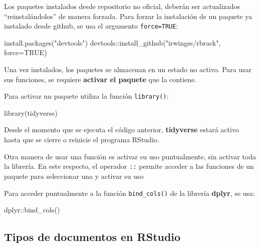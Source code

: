 \documentclass[
]{article}
\newenvironment{Shaded}{\begin{snugshade}}{\end{snugshade}}
\newcommand{\AttributeTok}[1]{\textcolor[rgb]{0.77,0.63,0.00}{#1}}
\newcommand{\ConstantTok}[1]{\textcolor[rgb]{0.00,0.00,0.00}{#1}}
\newcommand{\FunctionTok}[1]{\textcolor[rgb]{0.00,0.00,0.00}{#1}}
\newcommand{\NormalTok}[1]{#1}
\newcommand{\SpecialCharTok}[1]{\textcolor[rgb]{0.00,0.00,0.00}{#1}}
\newcommand{\StringTok}[1]{\textcolor[rgb]{0.31,0.60,0.02}{#1}}
\theoremstyle{definition}
\theoremstyle{definition}
\theoremstyle{definition}
\theoremstyle{definition}
\theoremstyle{remark}
\begin{document}
Los paquetes instalados desde repositorio no oficial, deberán ser actualizados ``reinstalándolos'' de manera forzada. Para forzar la instalación de un paquete ya instalado desde github, se usa el argumento \texttt{force=TRUE}:

\begin{Shaded}
\begin{Highlighting}[]
\FunctionTok{install.packages}\NormalTok{(}\StringTok{"devtools"}\NormalTok{)}
\NormalTok{devtools}\SpecialCharTok{::}\FunctionTok{install\_github}\NormalTok{(}\StringTok{"irwingss/rbrack"}\NormalTok{, }\AttributeTok{force=}\ConstantTok{TRUE}\NormalTok{)}
\end{Highlighting}
\end{Shaded}

\begin{rmdnote}
Una vez instalados, los paquetes se almacenan en un estado no activo. Para usar sus funciones, se requiere \textbf{activar el paquete} que la contiene.
\end{rmdnote}

Para activar un paquete utiliza la función \texttt{library()}:

\begin{Shaded}
\begin{Highlighting}[]
\FunctionTok{library}\NormalTok{(tidyverse)}
\end{Highlighting}
\end{Shaded}

Desde el momento que se ejecuta el código anterior, \textbf{tidyverse} estará activo hasta que se cierre o reinicie el programa RStudio.

\begin{rmdnote}
Otra manera de usar una función es activar su uso puntualmente, sin activar toda la librería. En este respecto, el operador \texttt{::} permite acceder a las funciones de un paquete para seleccionar una y activar su uso
\end{rmdnote}

Para acceder puntualmente a la función \texttt{bind\_cols()} de la librería \textbf{dplyr}, se usa:

\begin{Shaded}
\begin{Highlighting}[]
\NormalTok{dplyr}\SpecialCharTok{::}\FunctionTok{bind\_cols}\NormalTok{()}
\end{Highlighting}
\end{Shaded}

\hypertarget{tipos-de-documentos-en-rstudio}{%
\subsection{Tipos de documentos en RStudio}\label{tipos-de-documentos-en-rstudio}}
\end{document}
